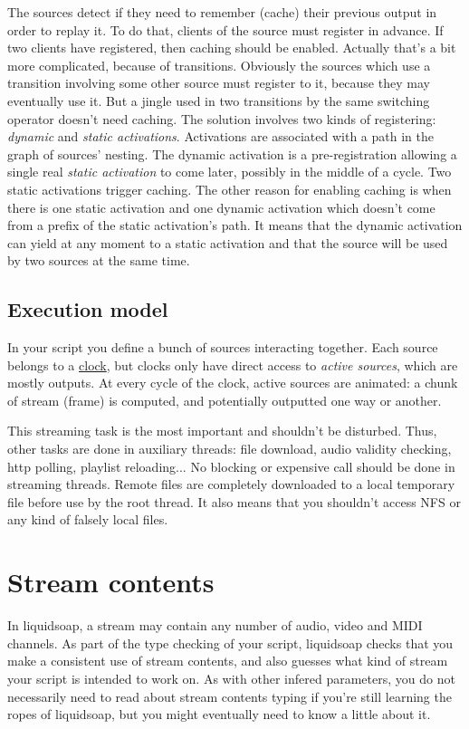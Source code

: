 The sources detect if they need to remember (cache) their previous output in 
order to replay it. To do that, clients of the source must register in 
advance. If two clients have registered, then caching should be enabled. 
Actually that's a bit more complicated, because of transitions. Obviously the 
sources which use a transition involving some other source must register to 
it, because they may eventually use it. But a jingle used in two transitions 
by the same switching operator doesn't need caching. The solution involves two 
kinds of registering: \emph{dynamic} and \emph{static activations}. Activations are 
associated with a path in the graph of sources' nesting. The dynamic 
activation is a pre-registration allowing a single real \emph{static activation}
to come later, possibly in the middle of a cycle.
Two static activations trigger caching. The other reason for enabling caching
is when there is one static activation and one dynamic activation which 
doesn't come from a prefix of the static activation's path. It means that the 
dynamic activation can yield at any moment to a static activation and that the 
source will be used by two sources at the same time.

\subsection{Execution model}
In your script you define a bunch of sources interacting together. Each
source belongs to a \href{clocks.html}{clock}, but clocks only have direct access
to \emph{active sources}, which are mostly outputs.
At every cycle of the clock, active sources are animated: a chunk of stream
(frame) is computed, and potentially outputted one way or another.

This streaming task is the most important and shouldn't be disturbed.
Thus, other tasks are done in auxiliary threads:
file download, audio validity checking, http polling, playlist reloading...
No blocking or expensive call should be done in streaming threads.
Remote files are completely downloaded to a local temporary file
before use by the root thread. It also means that you shouldn't access NFS
or any kind of falsely local files.


\section{Stream contents}
In liquidsoap, a stream may contain any number of audio, video and
MIDI channels. As part of the type checking of your script,
liquidsoap checks that you make a consistent use of stream contents,
and also guesses what kind of stream your script is intended to
work on. As with other infered parameters, you do not necessarily
need to read about stream contents typing if you're still learning
the ropes of liquidsoap, but you might eventually need to know a
little about it.

